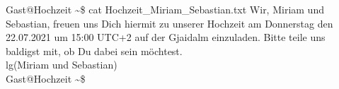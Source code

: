 \documentclass[12pt, a5paper]{article}
\begin{document}
\noindent
{\selectfont
\lbrack Gast@Hochzeit \textasciitilde\rbrack\$ cat Hochzeit\_Miriam\_Sebastian.txt
Wir, Miriam und Sebastian, freuen uns Dich hiermit zu unserer Hochzeit am Donnerstag den 22.07.2021 um 15:00 UTC+2 auf der Gjaidalm einzuladen. Bitte teile uns baldigst mit, ob Du dabei sein möchtest.\\ lg(Miriam und Sebastian) \\
\lbrack Gast@Hochzeit \textasciitilde\rbrack\$\\
}
\vspace*{-10px}
\begin{figure}[H]
\end{figure}
\end{document}
